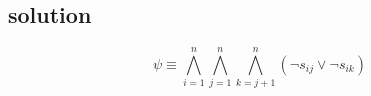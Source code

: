 \subsection{solution}


$$\psi \equiv \bigwedge_{i=1}^{n}\bigwedge_{j=1}^{n}\bigwedge_{k=j+1}^{n}(\neg s_{ij} \vee \neg s_{ik})$$

